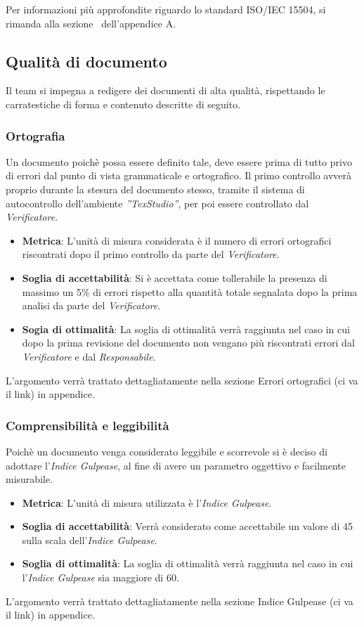 Per informazioni più approfondite riguardo lo standard ISO/IEC 15504, si rimanda alla sezione~ dell'appendice A.

\subsection{Qualità di documento}
Il team si impegna a redigere dei documenti di alta qualità, rispettando le carratestiche di forma e contenuto descritte di seguito.
\subsubsection{Ortografia}
Un documento poichè possa essere definito tale, deve essere prima di tutto privo di errori dal punto di vista grammaticale e ortografico. 
Il primo controllo avverà proprio durante la stesura del documento stesso, tramite il sistema di autocontrollo dell'ambiente  \emph{''TexStudio''}, per poi essere controllato dal  \emph{Verificatore}.
\begin{itemize}
	\item \textbf{Metrica}: L'unità di misura considerata è il numero di errori ortografici riscontrati dopo il primo controllo da parte del \emph{Verificatore}.
	\item \textbf{Soglia di accettabilità}: Si è accettata come tollerabile la presenza di massimo un 5\% di errori rispetto alla quantità totale segnalata dopo la prima analisi da parte del \emph{Verificatore}.
	\item \textbf{Sogia di ottimalità}: La soglia di ottimalità verrà raggiunta nel caso in cui dopo la prima revisione del documento non vengano più riscontrati errori dal \emph{Verificatore} e dal \emph{Responsabile}.
\end{itemize}
L'argomento verrà trattato dettagliatamente nella sezione Errori ortografici (ci va il link) in appendice.
\subsubsection{Comprensibilità e leggibilità}
Poichè un documento venga considerato leggibile e scorrevole si è deciso di adottare l'\emph{Indice Gulpease}, al fine di avere un parametro oggettivo e facilmente misurabile.
\begin{itemize}
	\item \textbf{Metrica}: L'unità di misura utilizzata è l'\emph{Indice Gulpease}.
	\item \textbf{Soglia di accettabilità}: Verrà considerato come accettabile un valore di 45 sulla scala dell'\emph{Indice Gulpease}.
	\item \textbf{Soglia di ottimalità}: La soglia di ottimalità verrà raggiunta nel caso in cui l'\emph{Indice Gulpease} sia maggiore di 60.
\end{itemize}
L'argomento verrà trattato dettagliatamente nella sezione Indice Gulpease (ci va il link) in appendice.

